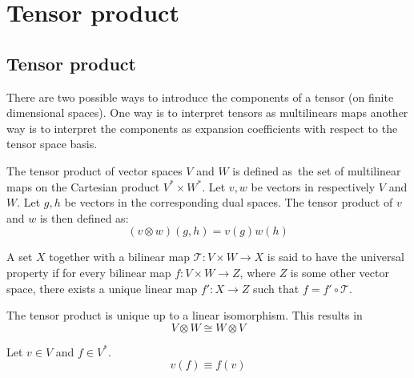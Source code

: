 \section{Tensor product}
\subsection{Tensor product}

	There are two possible ways to introduce the components of a tensor (on finite dimensional spaces). One way is to interpret tensors as multilinears maps another way is to interpret the components as expansion coefficients with respect to the tensor space basis.
    
    
	\begin{definition}\label{tensor:tensor_product}
    	The tensor product of vector spaces $V$ and $W$ is defined as\footnotemark\ the set of multilinear maps on the Cartesian product $V^*\times W^*$. Let $v, w$ be vectors in respectively $V$ and $W$. Let $g, h$ be vectors in the corresponding dual spaces. The tensor product of $v$ and $w$ is then defined as:
        \begin{equation}
            \boxed{(v\otimes w)(g, h) = v(g)w(h)}
        \end{equation}
    \end{definition}
    
     \begin{property}
    \label{tensor:prop:universal_property}
    	A set $X$ together with a bilinear map $\mathcal{T}:V\times W\rightarrow X$ is said to have the universal property if for every bilinear map $f:V\times W\rightarrow Z$, where $Z$ is some other vector space, there exists a unique linear map $f':X\rightarrow Z$ such that $f = f'\circ\mathcal{T}$.
    \end{property}
    \begin{result}
    	The tensor product is unique up to a linear isomorphism. This results in
    	\begin{equation}
		\label{tensor:prop:change}
	        	V\otimes W \cong W\otimes V
	\end{equation}
    \end{result}
    \begin{result}
		Let $v\in V$ and $f\in V^*$.
        \begin{equation}
        	v(f) \equiv f(v)
        \end{equation}
    \end{result}
    

